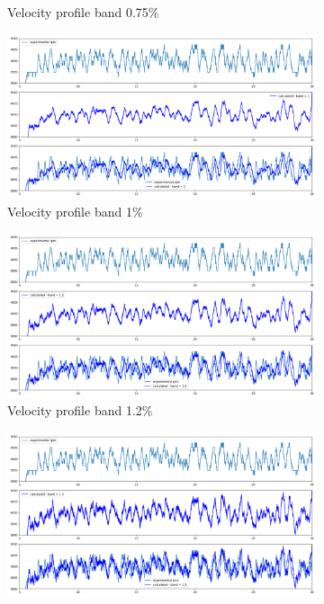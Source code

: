 \documentclass[10pt,fleqn,a4paper,twoside]{article}
\begin{document}
\begin{figure}
\begin{subfigure}{0.4\textwidth}
            \caption{Velocity profile band 0.75\%}
            \label{fig:third}
        \end{subfigure}
        \centering
        \hfill
        \begin{subfigure}{0.4\textwidth}
            \includegraphics[width=\textwidth]{Figures/rpm_analysis_mic4_band_1.png}
            \caption{Velocity profile band 1\%}
            \label{fig:fourth}
        \end{subfigure}
        \centering
        \hfill
        \begin{subfigure}{0.4\textwidth}
            \includegraphics[width=\textwidth]{Figures/rpm_analysis_mic4_band_1.2.png}
            \caption{Velocity profile band 1.2\%}
            \label{fig:fifth}
        \end{subfigure}
        \centering
        \hfill
        \begin{subfigure}{0.4\textwidth}
            \includegraphics[width=\textwidth]{Figures/rpm_analysis_mic4_band_1.5.png}

\end{subfigure}
\end{figure}
\end{document}
